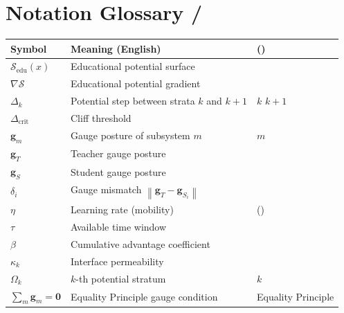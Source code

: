\documentclass[11pt,a4paper]{article}
\newcommand{\cS}{\mathcal{S}}
\newcommand{\norm}[1]{\left\lVert#1\right\rVert}
\newcommand{\gradS}{\nabla\mathcal{S}}
\newcommand{\sumgd}{\sum_m \mathbf{g}_m = \mathbf{0}}
\begin{document}
\section{Notation Glossary /}
\begin{table}[h]
\centering
\begin{tabular}{p{3cm} p{5cm} p{5cm}}
\toprule
\textbf{Symbol} & \textbf{Meaning (English)} & \textbf{ ()} \\
\midrule
$\cS_{\text{edu}}(x)$ & Educational potential surface &  \\
$\gradS$ & Educational potential gradient &  \\
$\Delta_k$ & Potential step between strata $k$ and $k+1$ &  $k$  $k+1$  \\
$\Delta_{\text{crit}}$ & Cliff threshold &  \\
$\mathbf{g}_m$ & Gauge posture of subsystem $m$ &  $m$  \\
$\mathbf{g}_T$ & Teacher gauge posture &  \\
$\mathbf{g}_S$ & Student gauge posture &  \\
$\delta_i$ & Gauge mismatch $\norm{\mathbf{g}_T - \mathbf{g}_{S_i}}$ &  \\
$\eta$ & Learning rate (mobility) & () \\
$\tau$ & Available time window &  \\
$\beta$ & Cumulative advantage coefficient &  \\
$\kappa_k$ & Interface permeability &  \\
$\Omega_k$ & $k$-th potential stratum &  $k$  \\
$\sumgd$ & Equality Principle gauge condition & Equality Principle \\
\bottomrule
\end{tabular}
\end{table}
\end{document}

